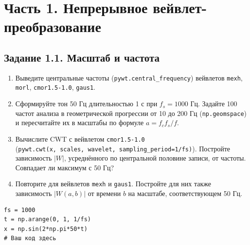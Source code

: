 \documentclass[12pt,a4paper,openany]{book}
\providecommand{\tightlist}{\setlength{\itemsep}{0pt}\setlength{\parskip}{0pt}}
\begin{document}
\section*{Часть 1. Непрерывное вейвлет-преобразование}

\subsection*{Задание 1.1. Масштаб и частота}

\begin{enumerate}
\def\labelenumi{\arabic{enumi}.}
\tightlist
\item
  Выведите центральные частоты (\texttt{pywt.\allowbreak{}central\_\allowbreak{}frequency}) вейвлетов \texttt{\textquotesingle{}\allowbreak{}mexh\textquotesingle{}\allowbreak{}}, \texttt{\textquotesingle{}\allowbreak{}morl\textquotesingle{}\allowbreak{}}, \texttt{\textquotesingle{}\allowbreak{}cmor1.\allowbreak{}5-1.\allowbreak{}0\textquotesingle{}\allowbreak{}}, \texttt{\textquotesingle{}\allowbreak{}gaus1\textquotesingle{}\allowbreak{}}.
\item
  Сформируйте тон 50 Гц длительностью 1 с при \(f_s = 1000\) Гц. Задайте 100 частот анализа в геометрической прогрессии от 10 до 200 Гц (\texttt{np.\allowbreak{}geomspace}) и пересчитайте их в масштабы по формуле \(a = f_c f_s / f\).
\item
  Вычислите CWT с вейвлетом \texttt{\textquotesingle{}\allowbreak{}cmor1.\allowbreak{}5-1.\allowbreak{}0\textquotesingle{}\allowbreak{}} (\texttt{pywt.\allowbreak{}cwt(\allowbreak{}x,\allowbreak{}\ scales,\allowbreak{}\ wavelet,\allowbreak{}\ sampling\_\allowbreak{}period=\allowbreak{}1/\allowbreak{}fs)}). Постройте зависимость \(|W|\), усреднённого по центральной половине записи, от частоты. Совпадает ли максимум с 50 Гц?
\item
  Повторите для вейвлетов \texttt{\textquotesingle{}\allowbreak{}mexh\textquotesingle{}\allowbreak{}} и \texttt{\textquotesingle{}\allowbreak{}gaus1\textquotesingle{}\allowbreak{}}. Постройте для них также зависимость \(|W(a, b)|\) от времени \(b\) на масштабе, соответствующем 50 Гц.
\end{enumerate}

\begin{Verbatim}[fontsize=\small, breaklines, breakanywhere, frame=single, framesep=2mm]
fs = 1000
t = np.arange(0, 1, 1/fs)
x = np.sin(2*np.pi*50*t)
# Ваш код здесь
\end{Verbatim}
\end{document}
